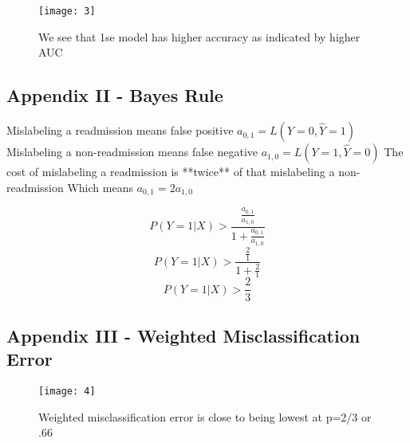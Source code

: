 \documentclass{article}
\begin{document}
\begin{figure}[h]
\centering
\texttt{[image: 3]}
\caption{We see that 1se model has higher accuracy as indicated by higher AUC}
\end{figure}

\newpage

\subsection{Appendix II - Bayes Rule}

Mislabeling a readmission means false positive $a_{0,1}=L(Y=0, \hat Y=1)$
Mislabeling a non-readmission means false negative $a_{1,0}=L(Y=1, \hat Y=0)$
The cost of mislabeling a readmission is **twice** of that mislabeling a non-readmission
Which means $a_{0,1}=2a_{1,0}$

$$P(Y=1 \vert X) > \frac{\frac{a_{0,1}}{a_{1,0}}}{1 + \frac{a_{0,1}}{a_{1,0}}}$$
$$P(Y=1 \vert X) > \frac{\frac{2}{1}}{1 + \frac{2}{1}}$$
$$P(Y=1 \vert X) > \frac{2}{3}$$

\subsection{Appendix III - Weighted Misclassification Error}

\begin{figure}[h]
\centering
\texttt{[image: 4]}
\caption{Weighted misclassification error is close to being lowest at p=2/3 or .66}
\end{figure}
\end{document}
